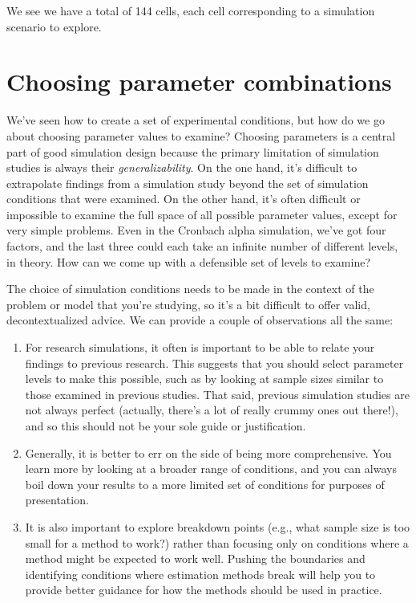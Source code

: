 \documentclass[
]{book}
\begin{document}
We see we have a total of 144 cells, each cell corresponding to a simulation scenario to explore.

\hypertarget{choosing-parameter-combinations}{%
\section{Choosing parameter combinations}\label{choosing-parameter-combinations}}

We've seen how to create a set of experimental conditions, but how do we go about choosing parameter values to examine? Choosing parameters is a central part of good simulation design because the primary limitation of simulation studies is always their \emph{generalizability}. On the one hand, it's difficult to extrapolate findings from a simulation study beyond the set of simulation conditions that were examined. On the other hand, it's often difficult or impossible to examine the full space of all possible parameter values, except for very simple problems. Even in the Cronbach alpha simulation, we've got four factors, and the last three could each take an infinite number of different levels, in theory. How can we come up with a defensible set of levels to examine?

The choice of simulation conditions needs to be made in the context of the problem or model that you're studying, so it's a bit difficult to offer valid, decontextualized advice.
We can provide a couple of observations all the same:

\begin{enumerate}
\def\labelenumi{\arabic{enumi}.}
\item
  For research simulations, it often is important to be able to relate your findings to previous research. This suggests that you should select parameter levels to make this possible, such as by looking at sample sizes similar to those examined in previous studies. That said, previous simulation studies are not always perfect (actually, there's a lot of really crummy ones out there!), and so this should not be your sole guide or justification.
\item
  Generally, it is better to err on the side of being more comprehensive. You learn more by looking at a broader range of conditions, and you can always boil down your results to a more limited set of conditions for purposes of presentation.
\item
  It is also important to explore breakdown points (e.g., what sample size is too small for a method to work?) rather than focusing only on conditions where a method might be expected to work well. Pushing the boundaries and identifying conditions where estimation methods break will help you to provide better guidance for how the methods should be used in practice.
\end{enumerate}
\end{document}
